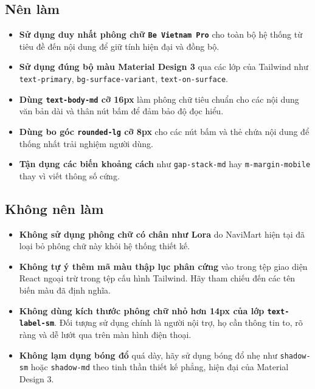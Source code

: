 \documentclass[12pt,a4paper]{article}
\newcommand{\code}[1]{\texttt{#1}}
\begin{document}
\subsection{Nên làm}
\begin{itemize}[leftmargin=*]
  \item \textbf{Sử dụng duy nhất phông chữ \code{Be Vietnam Pro}} cho toàn bộ hệ thống từ tiêu đề đến nội dung để giữ tính hiện đại và đồng bộ.
  \item \textbf{Sử dụng đúng bộ màu Material Design 3} qua các lớp của Tailwind như \code{text-primary}, \code{bg-surface-variant}, \code{text-on-surface}.
  \item \textbf{Dùng \code{text-body-md} cỡ 16px} làm phông chữ tiêu chuẩn cho các nội dung văn bản dài và thân nút bấm để đảm bảo độ đọc hiểu.
  \item \textbf{Dùng bo góc \code{rounded-lg} cỡ 8px} cho các nút bấm và thẻ chứa nội dung để thống nhất trải nghiệm người dùng.
  \item \textbf{Tận dụng các biến khoảng cách} như \code{gap-stack-md} hay \code{m-margin-mobile} thay vì viết thông số cứng.
\end{itemize}

\subsection{Không nên làm}
\begin{itemize}[leftmargin=*]
  \item \textbf{Không sử dụng phông chữ có chân như Lora} do NaviMart hiện tại đã loại bỏ phông chữ này khỏi hệ thống thiết kế.
  \item \textbf{Không tự ý thêm mã màu thập lục phân cứng} vào trong tệp giao diện React ngoại trừ trong tệp cấu hình Tailwind. Hãy tham chiếu đến các tên biến màu đã định nghĩa.
  \item \textbf{Không dùng kích thước phông chữ nhỏ hơn 14px của lớp \code{text-label-sm}}. Đối tượng sử dụng chính là người nội trợ, họ cần thông tin to, rõ ràng và dễ lướt qua trên màn hình điện thoại.
  \item \textbf{Không lạm dụng bóng đổ} quá dày, hãy sử dụng bóng đổ nhẹ như \code{shadow-sm} hoặc \code{shadow-md} theo tinh thần thiết kế phẳng, hiện đại của Material Design 3.
\end{itemize}
\end{document}
